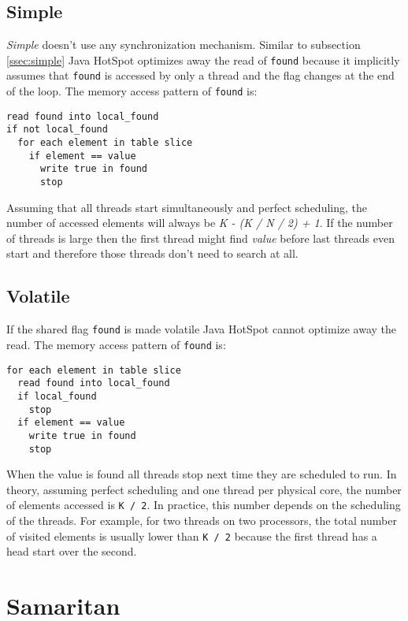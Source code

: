 \documentclass[12pt]{article}
\begin{document}
\subsection{Simple}

\emph{Simple} doesn't use any synchronization mechanism. Similar to
subsection \ref{ssec:simple} Java HotSpot optimizes away the
read of \texttt{found} because it implicitly assumes that \texttt{found}
is accessed by only a thread and the flag changes at the end of
the loop. The memory access pattern of \texttt{found} is:

\begin{verbatim}
read found into local_found
if not local_found
  for each element in table slice
    if element == value
      write true in found 
      stop
\end{verbatim}

Assuming that all threads start simultaneously and perfect scheduling, the
number of accessed elements will always be \emph{K - (K / N / 2) + 1}. If
the number of threads is large then the first thread might find \emph{value}
before last threads even start and therefore those threads don't need to
search at all.

\subsection{Volatile}

If the shared flag \texttt{found} is made volatile Java HotSpot cannot
optimize away the read. The memory access pattern of \texttt{found} is:

\begin{verbatim}
for each element in table slice
  read found into local_found
  if local_found
    stop
  if element == value
    write true in found 
    stop
\end{verbatim}

When the value is found all threads stop next time they are scheduled
to run. In theory, assuming perfect scheduling and one thread per physical core,
the number of elements accessed is \texttt{K / 2}. In practice, this number
depends on the scheduling of the threads. For example, for two threads on
two processors, the total number of visited elements is usually lower than
\texttt{K / 2} because the first thread has a head start over the second.


\newpage
\section{Samaritan}
\end{document}

